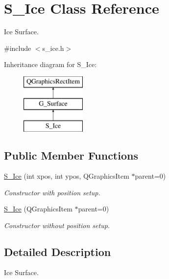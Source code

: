\hypertarget{class_s___ice}{}\section{S\+\_\+\+Ice Class Reference}
\label{class_s___ice}


Ice Surface.  




{\ttfamily \#include $<$s\+\_\+ice.\+h$>$}

Inheritance diagram for S\+\_\+\+Ice\+:\begin{figure}[H]
\begin{center}
\leavevmode
\includegraphics[height=3.000000cm]{class_s___ice}
\end{center}
\end{figure}
\subsection*{Public Member Functions}
\begin{DoxyCompactItemize}
\item 
\hyperlink{class_s___ice_a3a1fdb0204964dfee672629d22cd0e76}{S\+\_\+\+Ice} (int xpos, int ypos, Q\+Graphics\+Item $\ast$parent=0)
\begin{DoxyCompactList}\small\item\em Constructor with position setup. \end{DoxyCompactList}\item 
\hyperlink{class_s___ice_a17b24abf85ec0bd466971675b657f856}{S\+\_\+\+Ice} (Q\+Graphics\+Item $\ast$parent=0)
\begin{DoxyCompactList}\small\item\em Constructor without position setup. \end{DoxyCompactList}\end{DoxyCompactItemize}


\subsection{Detailed Description}
Ice Surface. 

